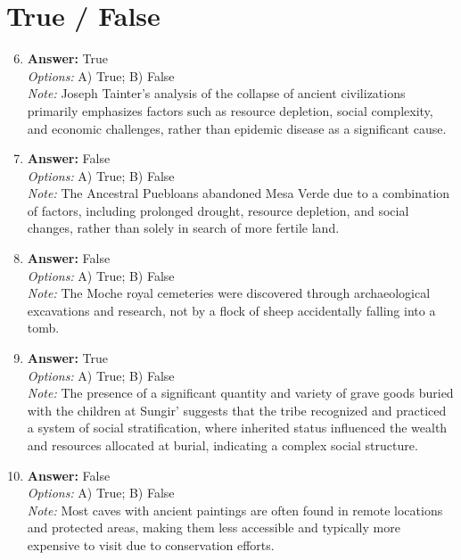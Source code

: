 \documentclass[12pt]{article}
\begin{document}
\section*{True / False}
\begin{enumerate}[label=\arabic*.]
\setcounter{enumi}{5}
\item \textbf{Answer:} True
\\ \textit{Options:} A) True; B) False
\\ \textit{Note:} Joseph Tainter's analysis of the collapse of ancient civilizations primarily emphasizes factors such as resource depletion, social complexity, and economic challenges, rather than epidemic disease as a significant cause.
\item \textbf{Answer:} False
\\ \textit{Options:} A) True; B) False
\\ \textit{Note:} The Ancestral Puebloans abandoned Mesa Verde due to a combination of factors, including prolonged drought, resource depletion, and social changes, rather than solely in search of more fertile land.
\item \textbf{Answer:} False
\\ \textit{Options:} A) True; B) False
\\ \textit{Note:} The Moche royal cemeteries were discovered through archaeological excavations and research, not by a flock of sheep accidentally falling into a tomb.
\item \textbf{Answer:} True
\\ \textit{Options:} A) True; B) False
\\ \textit{Note:} The presence of a significant quantity and variety of grave goods buried with the children at Sungir' suggests that the tribe recognized and practiced a system of social stratification, where inherited status influenced the wealth and resources allocated at burial, indicating a complex social structure.
\item \textbf{Answer:} False
\\ \textit{Options:} A) True; B) False
\\ \textit{Note:} Most caves with ancient paintings are often found in remote locations and protected areas, making them less accessible and typically more expensive to visit due to conservation efforts.
\end{enumerate}
\end{document}
